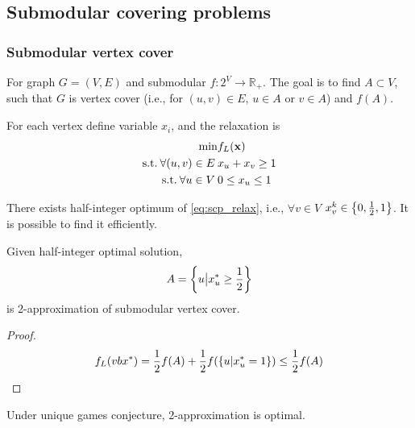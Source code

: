 \subsection{Submodular covering problems}
\subsubsection{Submodular vertex cover}
For graph $G=(V,E)$ and submodular $f: 2^V \to \mathbb{R}_+$. The goal is to find $A\subset V$, such that $G$ is vertex cover (i.e., for $ (u,v)\in E$, $u\in A$ or $v\in A$) and $f(A)$.

For each vertex define variable $x_i$, and the relaxation is 
\begin{align} \label{eq:scp_relax}
\min &  f_L(\vb{x}) \\ 
\text{s.t.} \: \forall (u,v)\in E \:&x_u+x_v \geq 1 \\
\text{s.t.} \: \forall u \in V \:&0\leq x_u \leq 1 
\end{align}

\begin{prop}
	There exists half-integer optimum of \vref{eq:scp_relax}, i.e., $\forall v\in V$ $x_v^k \in \qty{0,\frac{1}{2}, 1}$. It is possible to find it efficiently.
\end{prop}

\begin{prop}
	Given half-integer optimal solution, 
	\begin{align}
	A = \qty{ u \big\vert x^*_u \geq \frac{1}{2} }
	\end{align}
	is 2-approximation of submodular vertex cover.
	\begin{proof}
		\begin{align}
			f_L(vb{x}^*) = \frac{1}{2} f(A) + \frac{1}{2} f\qty(\qty{u|x^*_u=1}) \leq  \frac{1}{2} f(A)
		\end{align}
	\end{proof}
\end{prop}

\begin{prop}
	Under unique games conjecture, 2-approximation is optimal.
\end{prop}